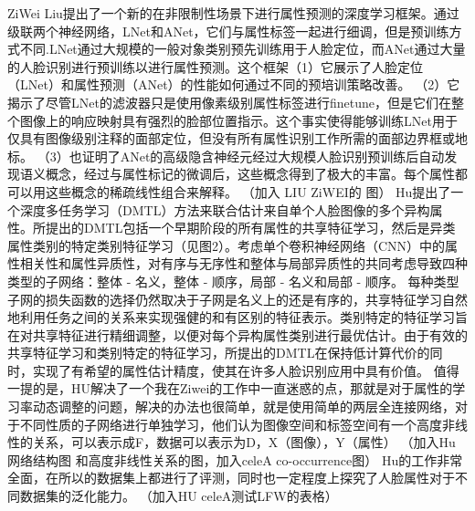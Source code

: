 ZiWei Liu提出了一个新的在非限制性场景下进行属性预测的深度学习框架。通过级联两个神经网络，LNet和ANet，它们与属性标签一起进行细调，但是预训练方式不同.LNet通过大规模的一般对象类别预先训练用于人脸定位，而ANet通过大量的人脸识别进行预训练以进行属性预测。这个框架（1）它展示了人脸定位（LNet）和属性预测（ANet）的性能如何通过不同的预培训策略改善。 （2）它揭示了尽管LNet的滤波器只是使用像素级别属性标签进行finetune，但是它们在整个图像上的响应映射具有强烈的脸部位置指示。这个事实使得能够训练LNet用于仅具有图像级别注释的面部定位，但没有所有属性识别工作所需的面部边界框或地标。 （3）也证明了ANet的高级隐含神经元经过大规模人脸识别预训练后自动发现语义概念，经过与属性标记的微调后，这些概念得到了极大的丰富。每个属性都可以用这些概念的稀疏线性组合来解释。
（加入 LIU ZiWEI的 图）
Hu提出了一个深度多任务学习（DMTL）方法来联合估计来自单个人脸图像的多个异构属性。所提出的DMTL包括一个早期阶段的所有属性的共享特征学习，然后是异类属性类别的特定类别特征学习（见图2）。考虑单个卷积神经网络（CNN）中的属性相关性和属性异质性，对有序与无序性和整体与局部异质性的共同考虑导致四种类型的子网络：整体 - 名义，整体 - 顺序，局部 - 名义和局部 - 顺序。 每种类型子网的损失函数的选择仍然取决于子网是名义上的还是有序的，共享特征学习自然地利用任务之间的关系来实现强健的和有区别的特征表示。类别特定的特征学习旨在对共享特征进行精细调整，以便对每个异构属性类别进行最优估计。由于有效的共享特征学习和类别特定的特征学习，所提出的DMTL在保持低计算代价的同时，实现了有希望的属性估计精度，使其在许多人脸识别应用中具有价值。
值得一提的是，HU解决了一个我在Ziwei的工作中一直迷惑的点，那就是对于属性的学习率动态调整的问题，解决的办法也很简单，就是使用简单的两层全连接网络，对于不同性质的子网络进行单独学习，他们认为图像空间和标签空间有一个高度非线性的关系，可以表示成F，数据可以表示为D，X（图像），Y（属性）
（加入Hu 网络结构图 和高度非线性关系的图，加入celeA co-occurrence图）
Hu的工作非常全面，在所以的数据集上都进行了评测，同时也一定程度上探究了人脸属性对于不同数据集的泛化能力。
（加入HU celeA测试LFW的表格）

